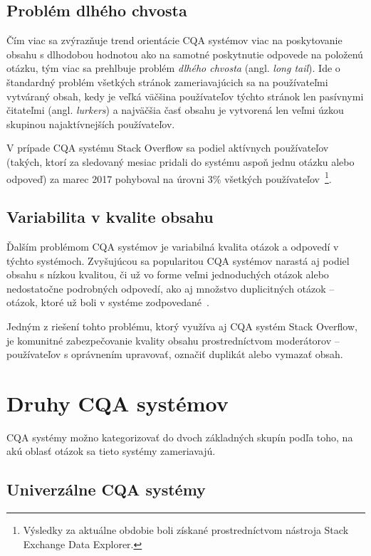 \subsection{Problém dlhého chvosta}
Čím viac sa zvýrazňuje trend orientácie CQA systémov viac na poskytovanie obsahu s dlhodobou hodnotou ako na samotné
poskytnutie odpovede na položenú otázku, tým viac sa prehlbuje problém \emph{dlhého chvosta} (angl. \emph{long tail}).
Ide o štandardný problém všetkých stránok zameriavajúcich sa na používateľmi vytváraný obsah, kedy je veľká väčšina
používateľov týchto stránok len pasívnymi čitateľmi (angl. \emph{lurkers}) a najväčšia časť obsahu je vytvorená len veľmi
úzkou skupinou najaktívnejších používateľov.

V prípade CQA systému Stack Overflow sa podiel aktívnych používateľov (takých, ktorí za sledovaný mesiac pridali
do systému aspoň jednu otázku alebo odpoveď) za marec 2017 pohyboval na úrovni 3\% všetkých
používateľov~\cite{Srba2016SOFail}\footnote{Výsledky za aktuálne obdobie boli získané prostredníctvom nástroja Stack
Exchange Data Explorer.}.

\subsection{Variabilita v kvalite obsahu}
Ďalším problémom CQA systémov je variabilná kvalita otázok a odpovedí v týchto systémoch. Zvyšujúcou sa popularitou CQA
systémov narastá aj podiel obsahu s nízkou kvalitou, či už vo forme veľmi jednoduchých otázok alebo nedostatočne
podrobných odpovedí, ako aj množstvo duplicitných otázok -- otázok, ktoré už boli v systéme
zodpovedané~\cite{Srba2016SOFail,Ponzanelli2014}.

Jedným z riešení tohto problému, ktorý využíva aj CQA systém Stack Overflow, je komunitné zabezpečovanie kvality obsahu
prostredníctvom moderátorov -- používateľov s oprávnením upravovať, označiť duplikát alebo vymazať obsah.


\section{Druhy CQA systémov}

CQA systémy možno kategorizovať do dvoch základných skupín podľa toho, na akú oblasť otázok sa tieto systémy zameriavajú.

\subsection{Univerzálne CQA systémy}

